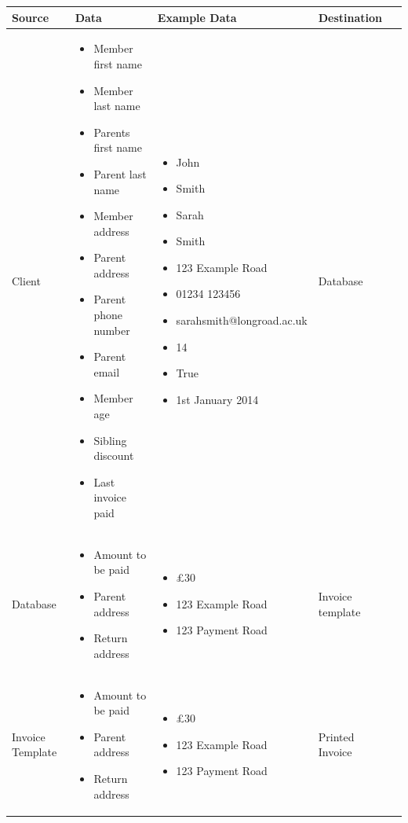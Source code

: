 \begin{table}[h]
\begin{tabular}{|p{1.5cm}|p{3.5cm}|p{5cm}|p{2cm}|l}
\hline
\textbf{Source} & \textbf{Data}  & \textbf{Example Data}  & \textbf{Destination}     \\ \hline
Client           &  \begin{itemize}
	\item Member first name
	\item Member last name
	\item Parents first name
	\item Parent last name
	\item Member address
	\item Parent address
	\item Parent phone number
	\item Parent email
	\item Member age
	\item Sibling discount
	\item Last invoice paid
\end{itemize} & 
\begin{itemize}
	\item John
	\item Smith
	\item Sarah
	\item Smith
	\item 123 Example Road
	\item 01234 123456
	\item sarahsmith@longroad.ac.uk
	\item 14
	\item True
	\item 1st January 2014
\end{itemize} & 
Database \\ \hline
Database &
\begin{itemize}
	\item Amount to be paid
	\item Parent address
	\item Return address
\end{itemize} & 
\begin{itemize}
	\item \pounds 30
	\item 123 Example Road
	\item 123 Payment Road
\end{itemize} & 
Invoice template \\ \hline
Invoice Template & 
\begin{itemize}
	\item Amount to be paid
	\item Parent address
	\item Return address
\end{itemize} & 
\begin{itemize}
	\item \pounds 30
	\item 123 Example Road
	\item 123 Payment Road
\end{itemize} & 
Printed Invoice \\
\hline
\end{tabular}
\end{table}

